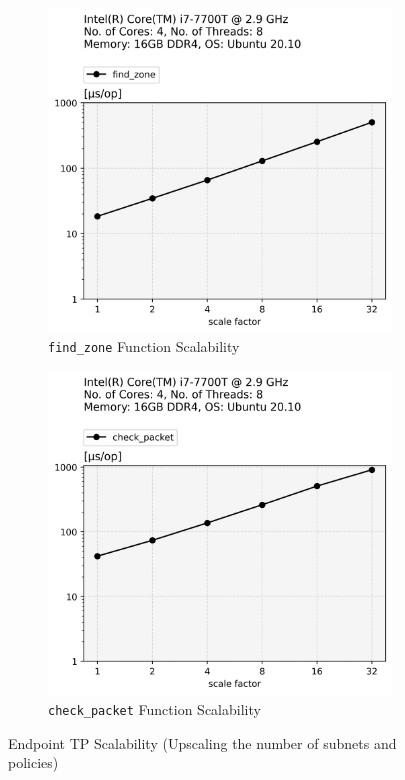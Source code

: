 \begin{figure}[t]
    \centering
    \begin{subfigure}[t]{.22\textwidth}
      \centering
      \includegraphics[width=\linewidth]{img/find_zone.png}
      \caption{\texttt{find\_zone} Function Scalability}
      \label{fig:sub: find zone Scalability}
    \end{subfigure}\hfill%
    \begin{subfigure}[t]{.22\textwidth}
      \centering
      \includegraphics[width=\linewidth]{img/check_packet.png}
      \caption{\texttt{check\_packet} Function Scalability}
      \label{fig:sub: check packet Scalability}
    \end{subfigure}
    \caption{Endpoint \acs{TP} Scalability (Upscaling the number of subnets and policies)}
    \label{fig:Endpoint TP Scalability}
\end{figure}

